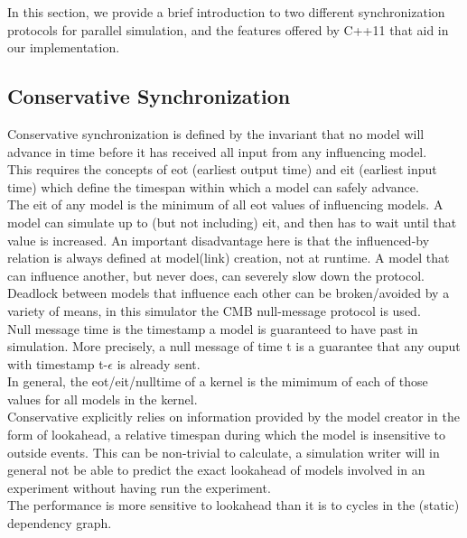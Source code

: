 In this section, we provide a brief introduction to two different synchronization protocols for parallel simulation, and the features offered by C++11 that aid in our implementation.

\subsection{Conservative Synchronization}
Conservative synchronization is defined by the invariant that no model will advance in time before it has received all input from any influencing model. \\
This requires the concepts of eot (earliest output time) and eit (earliest input time) which define the timespan within which a model can safely advance. \\ The eit of any model is the minimum of all eot values of influencing models. A model can simulate up to (but not including) eit, and then has to wait until that value is increased. An important disadvantage here is that the influenced-by relation is always defined at model(link) creation, not at runtime. A model that can influence another, but never does, can severely slow down the protocol.\\ 
Deadlock between models that influence each other can be broken/avoided by a variety of
means, in this simulator the CMB \cite{Chandy:1981:ADS:358598.358613} null-message protocol is used. \\
Null message time is the timestamp a model is guaranteed to have past in simulation. More precisely, a null message of time t is a guarantee that any ouput with timestamp t-$\epsilon$ is already sent.\\
In general, the eot/eit/nulltime of a kernel is the mimimum of each of those values for all models in the kernel.\\
Conservative explicitly relies on information provided by the model creator in the form of lookahead, a relative timespan during which the model is insensitive to outside events. This can be non-trivial to calculate, a simulation writer will in general not be able to predict the exact lookahead of models involved in an experiment without having run the experiment.\\
The performance is more sensitive to lookahead than it is to cycles in the (static) dependency graph.
